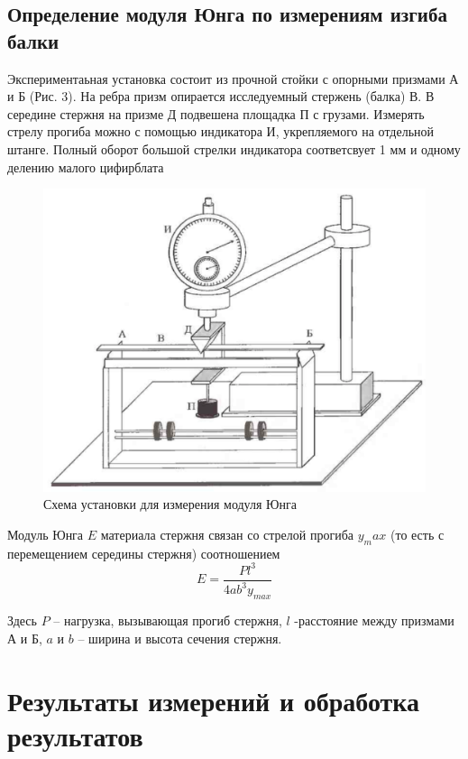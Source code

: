 \documentclass[a4paper,12pt]{article} %
\begin{document}
\subsection{Определение модуля Юнга по измерениям изгиба балки}
Экспериментаьная установка состоит из прочной стойки с опорными призмами А и Б (Рис. 3). На ребра призм опирается исследуемный стержень (балка) В. В середине стержня на призме Д подвешена площадка П с грузами. Измерять стрелу прогиба можно с помощью индикатора И, укрепляемого на отдельной штанге. Полный оборот большой стрелки индикатора соответсвует 1 мм и одному делению малого цифирблата

\begin{figure}[h]
\centering
\includegraphics[scale=0.4]{2}
\caption{Схема установки для измерения модуля Юнга}
\end{figure}
Модуль Юнга $E$ материала стержня связан со стрелой прогиба $y_max$ (то есть с перемещением середины стержня) соотношением
\begin{equation}
 E = \frac{P l^3}{4ab^3y_{max}}
\end{equation}

Здесь $P$ -- нагрузка, вызывающая прогиб стержня, $l$ -расстояние между призмами А и Б, $a$ и $b$ -- ширина и высота сечения стержня.
\section{Результаты измерений и обработка результатов}
\end{document}
